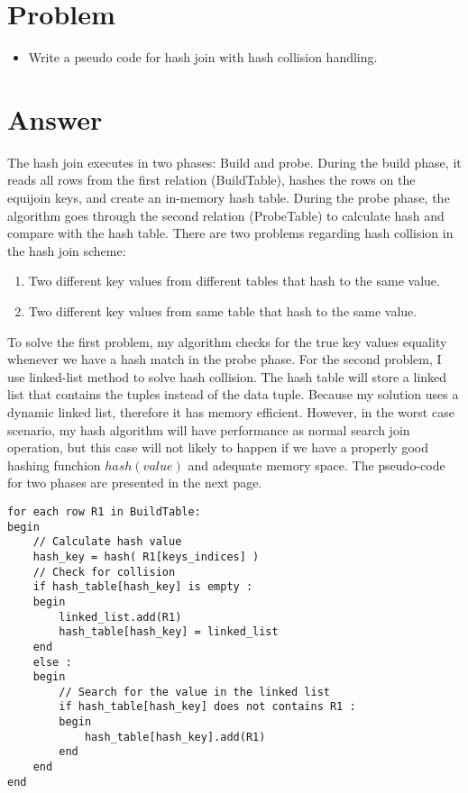 \documentclass[a4paper,12pt]{article}
\begin{document}
\begin{itemize}




\section*{Problem}

\begin{itemize}
    \setlength{\itemsep}{0cm}
    \setlength{\parskip}{0cm}
    \item Write a pseudo code for hash join with hash collision handling.
\end{itemize}
\vspace{4em}
\section*{Answer}
\noindent
The hash join executes in two phases: Build and probe. During the build phase, it reads all rows from the first relation (BuildTable), hashes the rows on the equijoin keys, and create an in-memory hash table. During the probe phase, the algorithm goes through the second relation (ProbeTable) to calculate hash and compare with the hash table. There are two problems regarding hash collision in the hash join scheme:
\begin{enumerate}
    \setlength{\itemsep}{0cm}
    \setlength{\parskip}{0cm}
    \item Two different key values from different tables that hash to the same value.
    \item Two different key values from same table that hash to the same value.
\end{enumerate}
To solve the first problem, my algorithm checks for the true key values equality whenever we have a hash match in the probe phase. For the second problem, I use linked-list method to solve hash collision. The hash table will store a linked list that contains the tuples instead of the data tuple. Because my solution uses a dynamic linked list, therefore it has memory efficient. However, in the worst case scenario, my hash algorithm will have performance as normal search join operation,
but this case will not likely to happen if we have a properly good hashing funchion $hash(value)$ and adequate memory space. The pseudo-code for two phases are presented in the next page.
\pagebreak
\vspace*{2em}
\begin{lstlisting}[caption={Hash Join Algorithm - Build Phase}]
for each row R1 in BuildTable:
begin
    // Calculate hash value
    hash_key = hash( R1[keys_indices] )
    // Check for collision
    if hash_table[hash_key] is empty : 
    begin
        linked_list.add(R1)
        hash_table[hash_key] = linked_list 
    end
    else :
    begin
        // Search for the value in the linked list
        if hash_table[hash_key] does not contains R1 :
        begin
            hash_table[hash_key].add(R1)
        end
    end
end
\end{lstlisting}


\end{itemize}
\end{document}
